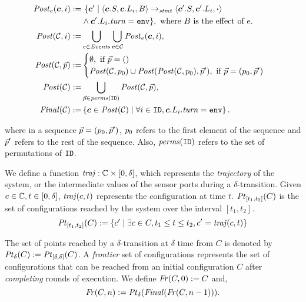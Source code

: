 \vspace{1mm}
\begin{mdframed}
\footnotesize
\begin{align*}
    \mathit{Post}_e(\mathit{\boldsymbol{c}},i) := &\ \{ \mathit{\boldsymbol{c}}' \mid \left\langle \mathit{\boldsymbol{c}}.S, \mathit{\boldsymbol{c}}.L_{i}, B \right\rangle \rightarrow_\mathit{stmt} \left\langle \mathit{\boldsymbol{c}}'.S, \mathit{\boldsymbol{c}}'.L_{i}, \mathtt{\boldsymbol{\cdot}} \right\rangle \\
                             & \land \mathit{\boldsymbol{c}}'.L_{i}.\mathit{turn} = \mathtt{env}\}, \text{ where } B \text{ is the effect of } e.\\
    \mathit{Post}(\mathcal{C},i) := & \bigcup_{e \in \mathit{Events}} \bigcup_{\mathit{\boldsymbol{c}}\in\mathcal{C}} \mathit{Post}_e(\mathit{\boldsymbol{c}}, i),\\
    \mathit{Post}(\mathcal{C},\vec{p}) := &
        \begin{cases}
            \emptyset, \text{ if } \vec{p}=()\\
            \mathit{Post}(\mathcal{C},p_0) \cup \mathit{Post}(\mathit{Post}(\mathcal{C},p_0),\vec{p}'), \text{ if } \vec{p}=(p_0, \vec{p}')\\
        \end{cases}\\
    \mathit{Post}(\mathcal{C}) := & \bigcup_{\vec{p}\in \mathit{perms}(\texttt{ID})} \mathit{Post}(\mathcal{C},\vec{p}), \\
    \mathit{Final}(\mathcal{C}) := & \left\{ \mathit{\boldsymbol{c}}\in \mathit{Post}(\mathcal{C})\mid \forall i \in \texttt{ID}, \mathit{\boldsymbol{c}}.L_i.\mathit{turn} = \mathtt{env} \right\}.
\end{align*}
\end{mdframed}
where in a sequence $\vec{p}=(p_0, \vec{p}')$, $p_0$ refers to the first element of the sequence and $\vec{p}'$ refers to the rest of the sequence.
Also, $\mathit{perms}(\texttt{ID})$ refers to the set of permutations of $\texttt{ID}$.

We define a function $\mathit{traj}: \mathbb{C} \times \left[0,\delta\right]$, which represents the \emph{trajectory} of the system, or the intermediate values of the sensor ports during a $\delta$-transition. Given $c\in \mathbb{C}, t\in \left[0,\delta\right]$, $\mathit{traj}(c,t)$ represents the configuration at time $t$. $\mathit{Pt}_{[t_1,t_2]}(C)$ is the set of configurations reached by the system over the interval $[t_1,t_2]$.
$$\mathit{Pt}_{[t_1,t_2]}(C) := \left\{c^\prime \mid \exists c\in C, t_1 \leq t\leq t_2 , c^\prime = \mathit{traj}(c,t)\right\}$$

The set of points reached by a $\delta$-transition at $\delta$ time from $C$ is denoted by  $\mathit{Pt}_{\delta}(C) := \mathit{Pt}_{[\delta,\delta]}(C)$. A \emph{frontier} set of configurations represents the set of configurations that can be reached from an initial configuration $C$ after \emph{completing} rounds of execution. 
We define $\mathit{Fr}(C,0) := C$ and,
$$\mathit{Fr}(C,n) := \mathit{Pt}_{\delta}(\mathit{Final}(\mathit{Fr}(C,n-1))).$$


